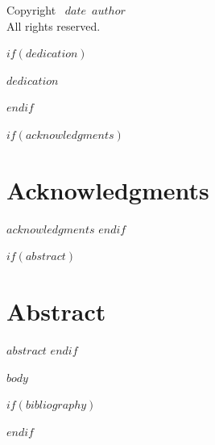 \documentclass[12pt,oneside]{book}
\def\booktitle{$book_title$}
\def\bookauthor{$author$}
\def\bookdate{$date$}
\def\bookpublisher{$publisher$}
\def\bookedition{$edition$}
\begin{document}
\frontmatter

\begin{titlepage}
\begin{center}
\vspace*{1in}
{\Huge\bfseries\booktitle\par}
\vspace{0.5in}
{\Large\bookauthor\par}
\vfill
{\large\bookedition}\\
\bigskip
{\large\bookpublisher}\\
{\large\bookdate}
\end{titlepage}

\thispagestyle{empty}
\vspace*{\fill}
Copyright \textcopyright\ \bookdate\ \bookauthor\\
All rights reserved.
\vfill

$if(dedication)$
\clearpage
\begin{center}
\textit{$dedication$}
\end{center}
$endif$

$if(acknowledgments)$
\chapter{Acknowledgments}
$acknowledgments$
$endif$

$if(abstract)$
\chapter{Abstract}
$abstract$
$endif$

\tableofcontents

\listoffigures

\listoftables

\mainmatter

$body$

\backmatter

$if(bibliography)$


$endif$

\printindex
\end{document}
